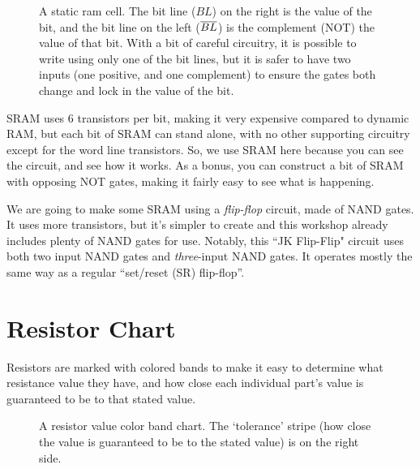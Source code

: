 
\begin{figure}[h!]
\begin{center}

\caption{A static ram cell. The bit line ($BL$) on the right is the value of the bit, and the bit line on the left ($\overline{BL}$) is the complement (NOT) the value of that bit. With a bit of careful circuitry, it is possible to write using only one of the bit lines, but it is safer to have two inputs (one positive, and one complement) to ensure the gates both change and lock in the value of the bit. } 
\label{fig:sram}
\end{center}
\end{figure}

SRAM uses 6 transistors per bit, making it very expensive compared to dynamic RAM, 
but each bit of SRAM can stand alone, with no other supporting circuitry except 
for the word line transistors. So, we use SRAM here because you can see the 
circuit, and see how it works. As a bonus, you can construct a bit of SRAM with 
opposing NOT gates, making it fairly easy to see what is happening.

We are going to make some SRAM using a \emph{flip-flop} circuit, made of NAND gates.
It uses more transistors, but it's simpler to create and this workshop already 
includes plenty of NAND gates for use. Notably, this ``JK Flip-Flip" circuit uses
both two input NAND gates and \emph{three}-input NAND gates. It operates mostly
the same way as a regular ``set/reset (SR) flip-flop''.


\clearpage


\section*{Resistor Chart}

Resistors are marked with colored bands to make it easy to determine what resistance value they have, and how close each individual part's value is guaranteed to be to that stated value.


\begin{figure}[!ht]
\begin{center}
\caption{A resistor value color band chart. The `tolerance' stripe (how close the value is guaranteed to be to the stated value) is on the right side. }
\label{fig:resistorchart}
\end{center}
\end{figure}
